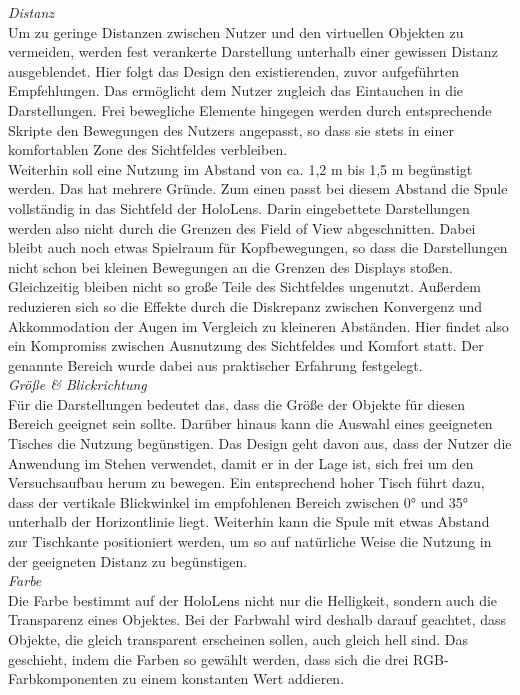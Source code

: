 \textit{Distanz}\\
Um zu geringe Distanzen zwischen Nutzer und den virtuellen Objekten zu vermeiden, werden fest verankerte Darstellung unterhalb einer gewissen Distanz ausgeblendet. Hier folgt das Design den existierenden, zuvor aufgeführten Empfehlungen. Das ermöglicht dem Nutzer zugleich das Eintauchen in die Darstellungen. Frei bewegliche Elemente hingegen werden durch entsprechende Skripte den Bewegungen des Nutzers angepasst, so dass sie stets in einer komfortablen Zone des Sichtfeldes verbleiben.\\

Weiterhin soll eine Nutzung im Abstand von ca. 1,2 m bis 1,5 m begünstigt werden. Das hat mehrere Gründe. Zum einen passt bei diesem Abstand die Spule vollständig in das Sichtfeld der HoloLens. Darin eingebettete Darstellungen werden also nicht durch die Grenzen des Field of View abgeschnitten. Dabei bleibt auch noch etwas Spielraum für Kopfbewegungen, so dass die Darstellungen nicht schon bei kleinen Bewegungen an die Grenzen des Displays stoßen. Gleichzeitig bleiben nicht so große Teile des Sichtfeldes ungenutzt. Außerdem reduzieren sich so die Effekte durch die Diskrepanz zwischen Konvergenz und Akkommodation der Augen im Vergleich zu kleineren Abständen. Hier findet also ein Kompromiss zwischen Ausnutzung des Sichtfeldes und Komfort statt. Der genannte Bereich wurde dabei aus praktischer Erfahrung festgelegt.\\

\textit{Größe \& Blickrichtung}\\
Für die Darstellungen bedeutet das, dass die Größe der Objekte für diesen Bereich geeignet sein sollte. Darüber hinaus kann die Auswahl eines geeigneten Tisches die Nutzung begünstigen. Das Design geht davon aus, dass der Nutzer die Anwendung im Stehen verwendet, damit er in der Lage ist, sich frei um den Versuchsaufbau herum zu bewegen. Ein entsprechend hoher Tisch führt dazu, dass der vertikale Blickwinkel im empfohlenen Bereich zwischen 0° und 35° unterhalb der Horizontlinie liegt. Weiterhin kann die Spule mit etwas Abstand zur Tischkante positioniert werden, um so auf natürliche Weise die Nutzung in der geeigneten Distanz zu begünstigen.\\

\textit{Farbe}\\
Die Farbe bestimmt auf der HoloLens nicht nur die Helligkeit, sondern auch die Transparenz eines Objektes. Bei der Farbwahl wird deshalb darauf geachtet, dass Objekte, die gleich transparent erscheinen sollen, auch gleich hell sind. Das geschieht, indem die Farben so gewählt werden, dass sich die drei RGB-Farbkomponenten zu einem konstanten Wert addieren.\\

